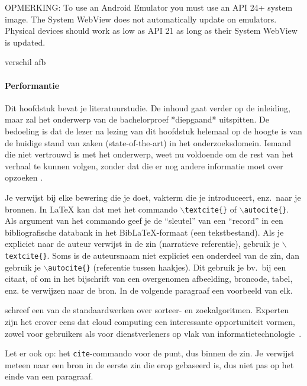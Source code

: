 OPMERKING: To use an Android Emulator you must use an API 24+ system image. The System WebView does not automatically update on emulators. Physical devices should work as low as API 21 as long as their System WebView is updated.



verschil afb
\paragraph{Performantie}

Dit hoofdstuk bevat je literatuurstudie. De inhoud gaat verder op de inleiding, maar zal het onderwerp van de bachelorproef *diepgaand* uitspitten. De bedoeling is dat de lezer na lezing van dit hoofdstuk helemaal op de hoogte is van de huidige stand van zaken (state-of-the-art) in het onderzoeksdomein. Iemand die niet vertrouwd is met het onderwerp, weet nu voldoende om de rest van het verhaal te kunnen volgen, zonder dat die er nog andere informatie moet over opzoeken \autocite{Pollefliet2011}.

Je verwijst bij elke bewering die je doet, vakterm die je introduceert, enz.\ naar je bronnen. In \LaTeX{} kan dat met het commando \texttt{$\backslash${textcite\{\}}} of \texttt{$\backslash${autocite\{\}}}. Als argument van het commando geef je de ``sleutel'' van een ``record'' in een bibliografische databank in het Bib\LaTeX{}-formaat (een tekstbestand). Als je expliciet naar de auteur verwijst in de zin (narratieve referentie), gebruik je \texttt{$\backslash${}textcite\{\}}. Soms is de auteursnaam niet expliciet een onderdeel van de zin, dan gebruik je \texttt{$\backslash${}autocite\{\}} (referentie tussen haakjes). Dit gebruik je bv.~bij een citaat, of om in het bijschrift van een overgenomen afbeelding, broncode, tabel, enz. te verwijzen naar de bron. In de volgende paragraaf een voorbeeld van elk.

\textcite{Knuth1998} schreef een van de standaardwerken over sorteer- en zoekalgoritmen. Experten zijn het erover eens dat cloud computing een interessante opportuniteit vormen, zowel voor gebruikers als voor dienstverleners op vlak van informatietechnologie~\autocite{Creeger2009}.

Let er ook op: het \texttt{cite}-commando voor de punt, dus binnen de zin. Je verwijst meteen naar een bron in de eerste zin die erop gebaseerd is, dus niet pas op het einde van een paragraaf.

\lipsum[7-20]
